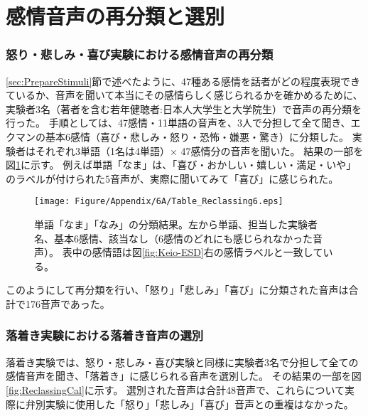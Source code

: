 \section{感情音声の再分類と選別}
\label{sec:Reclass}
\subsubsection{怒り・悲しみ・喜び実験における感情音声の再分類}

\ref{sec:PrepareStimuli}節で述べたように、47種ある感情を話者がどの程度表現できているか、音声を聞いて本当にその感情らしく感じられるかを確かめるために、
実験者3名（著者を含む若年健聴者:日本人大学生と大学院生）で音声の再分類を行った。
手順としては、47感情・11単語の音声を、3人で分担して全て聞き、エクマンの基本6感情（喜び・悲しみ・怒り・恐怖・嫌悪・驚き）\cite{ekman1992argument}に分類した。
実験者はそれぞれ3単語（1名は4単語）$\times$ 47感情分の音声を聞いた。
結果の一部を図\ref{fig:Reclassing6}に示す。
例えば単語「なま」は、「喜び・おかしい・嬉しい・満足・いや」のラベルが付けられた5音声が、実際に聞いてみて「喜び」に感じられた。

\begin{figure}[h]
  \vspace{50pt}
  \centering
  \texttt{[image: Figure/Appendix/6A/Table\_Reclassing6.eps]}
  \caption{
    単語「なま」「なみ」の分類結果。左から単語、担当した実験者名、基本6感情、該当なし（6感情のどれにも感じられなかった音声）。
    表中の感情語は図\ref{fig:Keio-ESD}右の感情ラベルと一致している。
    }
  \label{fig:Reclassing6}
\end{figure}


このようにして再分類を行い、「怒り」「悲しみ」「喜び」に分類された音声は合計で176音声であった。


\clearpage
\subsubsection{落着き実験における落着き音声の選別}
落着き実験では、怒り・悲しみ・喜び実験と同様に実験者3名で分担して全ての感情音声を聞き、「落着き」に感じられる音声を選別した。
その結果の一部を図\ref{fig:ReclassingCal}に示す。
選別された音声は合計48音声で、これらについて実際に弁別実験に使用した「怒り」「悲しみ」「喜び」音声との重複はなかった。


